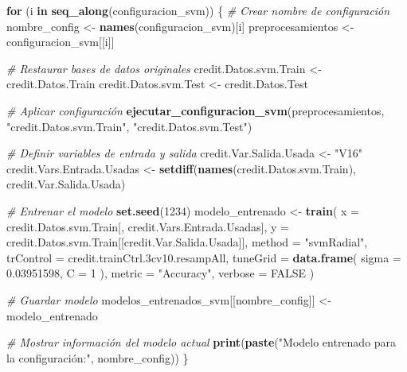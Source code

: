 \documentclass[
]{article}
\newenvironment{Shaded}{\begin{snugshade}}{\end{snugshade}}
\newcommand{\AttributeTok}[1]{\textcolor[rgb]{0.13,0.29,0.53}{#1}}
\newcommand{\CommentTok}[1]{\textcolor[rgb]{0.56,0.35,0.01}{\textit{#1}}}
\newcommand{\ConstantTok}[1]{\textcolor[rgb]{0.56,0.35,0.01}{#1}}
\newcommand{\ControlFlowTok}[1]{\textcolor[rgb]{0.13,0.29,0.53}{\textbf{#1}}}
\newcommand{\DecValTok}[1]{\textcolor[rgb]{0.00,0.00,0.81}{#1}}
\newcommand{\FloatTok}[1]{\textcolor[rgb]{0.00,0.00,0.81}{#1}}
\newcommand{\FunctionTok}[1]{\textcolor[rgb]{0.13,0.29,0.53}{\textbf{#1}}}
\newcommand{\NormalTok}[1]{#1}
\newcommand{\OtherTok}[1]{\textcolor[rgb]{0.56,0.35,0.01}{#1}}
\newcommand{\StringTok}[1]{\textcolor[rgb]{0.31,0.60,0.02}{#1}}
\begin{document}
\begin{Shaded}
\begin{Highlighting}[]
\ControlFlowTok{for}\NormalTok{ (i }\ControlFlowTok{in} \FunctionTok{seq\_along}\NormalTok{(configuracion\_svm)) \{}
  \CommentTok{\# Crear nombre de configuración}
\NormalTok{  nombre\_config }\OtherTok{\textless{}{-}} \FunctionTok{names}\NormalTok{(configuracion\_svm)[i]}
\NormalTok{  preprocesamientos }\OtherTok{\textless{}{-}}\NormalTok{ configuracion\_svm[[i]]}
  
  \CommentTok{\# Restaurar bases de datos originales}
\NormalTok{  credit.Datos.svm.Train }\OtherTok{\textless{}{-}}\NormalTok{ credit.Datos.Train}
\NormalTok{  credit.Datos.svm.Test }\OtherTok{\textless{}{-}}\NormalTok{ credit.Datos.Test}
  
  \CommentTok{\# Aplicar configuración}
  \FunctionTok{ejecutar\_configuracion\_svm}\NormalTok{(preprocesamientos, }\StringTok{"credit.Datos.svm.Train"}\NormalTok{, }\StringTok{"credit.Datos.svm.Test"}\NormalTok{)}
  
  \CommentTok{\# Definir variables de entrada y salida}
\NormalTok{  credit.Var.Salida.Usada }\OtherTok{\textless{}{-}} \StringTok{"V16"}
\NormalTok{  credit.Vars.Entrada.Usadas }\OtherTok{\textless{}{-}} \FunctionTok{setdiff}\NormalTok{(}\FunctionTok{names}\NormalTok{(credit.Datos.svm.Train), credit.Var.Salida.Usada)}
  
  \CommentTok{\# Entrenar el modelo}
  \FunctionTok{set.seed}\NormalTok{(}\DecValTok{1234}\NormalTok{)}
\NormalTok{  modelo\_entrenado }\OtherTok{\textless{}{-}} \FunctionTok{train}\NormalTok{(}
    \AttributeTok{x =}\NormalTok{ credit.Datos.svm.Train[, credit.Vars.Entrada.Usadas],}
    \AttributeTok{y =}\NormalTok{ credit.Datos.svm.Train[[credit.Var.Salida.Usada]],}
    \AttributeTok{method =} \StringTok{"svmRadial"}\NormalTok{,}
    \AttributeTok{trControl =}\NormalTok{ credit.trainCtrl}\FloatTok{.3}\NormalTok{cv10.resampAll,}
    \AttributeTok{tuneGrid =} \FunctionTok{data.frame}\NormalTok{(}
      \AttributeTok{sigma =} \FloatTok{0.03951598}\NormalTok{,              }
      \AttributeTok{C =} \DecValTok{1}         
\NormalTok{    ),}
    \AttributeTok{metric =} \StringTok{"Accuracy"}\NormalTok{,}
    \AttributeTok{verbose =} \ConstantTok{FALSE}
\NormalTok{  )}
  
  \CommentTok{\# Guardar modelo}
\NormalTok{  modelos\_entrenados\_svm[[nombre\_config]] }\OtherTok{\textless{}{-}}\NormalTok{ modelo\_entrenado}
  
  \CommentTok{\# Mostrar información del modelo actual}
  \FunctionTok{print}\NormalTok{(}\FunctionTok{paste}\NormalTok{(}\StringTok{"Modelo entrenado para la configuración:"}\NormalTok{, nombre\_config))}
\NormalTok{\}}
\end{Highlighting}
\end{Shaded}
\end{document}
